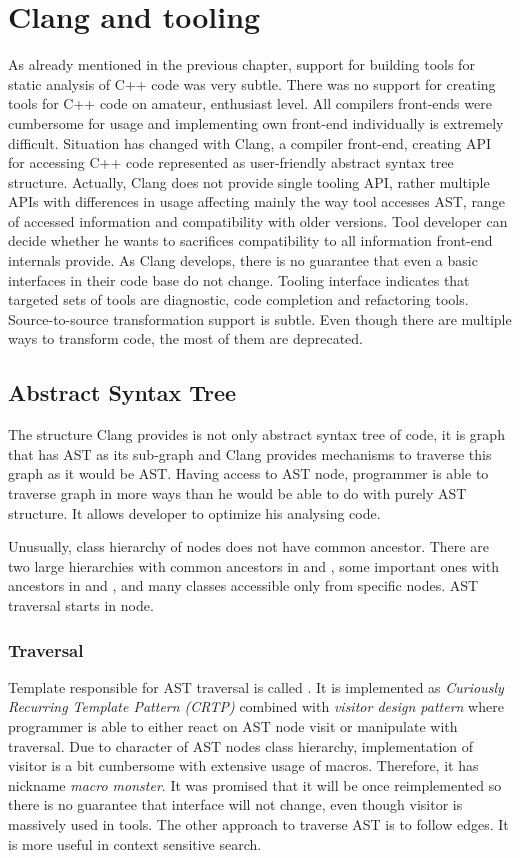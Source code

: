 \chapter{Clang and tooling}
As already mentioned in the previous chapter, support for building tools for static analysis of C++ code was very subtle. There was no support for creating tools for C++ code on amateur, enthusiast level. All compilers front-ends were cumbersome for usage and implementing own front-end individually is extremely difficult. Situation has changed with Clang, a compiler front-end, creating API for accessing C++ code represented as user-friendly abstract syntax tree structure. Actually, Clang does not provide single tooling API, rather multiple APIs with differences in usage affecting mainly the way tool accesses AST, range of accessed information and compatibility with older versions. Tool developer can decide whether he wants to sacrifices compatibility to all information front-end internals provide. As Clang develops, there is no guarantee that even a basic interfaces in their code base do not change. Tooling interface indicates that targeted sets of tools are diagnostic, code completion and refactoring tools. Source-to-source transformation support is subtle. Even though there are multiple ways to transform code, the most of them are deprecated.

\section{Abstract Syntax Tree}
The structure Clang provides is not only abstract syntax tree of code, it is graph that has AST as its sub-graph and Clang provides mechanisms to traverse this graph as it would be AST. Having access to AST node, programmer is able to traverse graph in more ways than he would be able to do with purely AST structure. It allows developer to optimize his analysing code.

Unusually, class hierarchy of nodes does not have common ancestor. There are two large hierarchies with common ancestors in  and , some important ones with ancestors in  and , and many classes accessible only from specific nodes. AST traversal starts in  node. 

\subsection{Traversal}
\label{clang-ast-traversal}
Template responsible for AST traversal is called . It is implemented as \emph{Curiously Recurring Template Pattern (CRTP)} combined with \emph{visitor design pattern} where programmer is able to either react on AST node visit or manipulate with traversal. Due to character of AST nodes class hierarchy, implementation of visitor is a bit cumbersome with extensive usage of macros. Therefore, it has nickname \textit{macro monster}. It was promised that it will be once reimplemented so there is no guarantee that interface will not change, even though visitor is massively used in tools. The other approach to traverse AST is to follow edges. It is more useful in context sensitive search.

